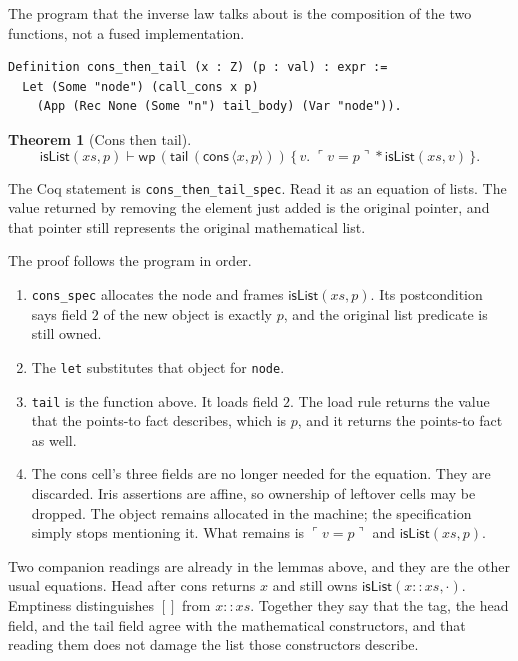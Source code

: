 \documentclass[11pt]{article}
\newtheorem{theorem}{Theorem}
\newcommand{\sep}{\mathbin{*}}
\newcommand{\Wpre}{\mathsf{wp}}
\newcommand{\pure}[1]{\ulcorner #1 \urcorner}
\begin{document}
The program that the inverse law talks about is the composition of the two functions, not a fused implementation.

\begin{lstlisting}
Definition cons_then_tail (x : Z) (p : val) : expr :=
  Let (Some "node") (call_cons x p)
    (App (Rec None (Some "n") tail_body) (Var "node")).
\end{lstlisting}

\begin{theorem}[Cons then tail]
\[
\mathsf{isList}(xs, p)
\vdash
\Wpre\,(\mathsf{tail}\,(\mathsf{cons}\,\langle x, p\rangle))
\,\{\,v.\; \pure{v = p} \sep \mathsf{isList}(xs, v)\,\}.
\]
\end{theorem}

The Coq statement is \texttt{cons\_then\_tail\_spec}.
Read it as an equation of lists.
The value returned by removing the element just added is the original pointer, and that pointer still represents the original mathematical list.

The proof follows the program in order.
\begin{enumerate}
\item \texttt{cons\_spec} allocates the node and frames \(\mathsf{isList}(xs, p)\).
Its postcondition says field \(2\) of the new object is exactly \(p\), and the original list predicate is still owned.
\item The \texttt{let} substitutes that object for \texttt{node}.
\item \texttt{tail} is the function above.
It loads field \(2\).
The load rule returns the value that the points-to fact describes, which is \(p\), and it returns the points-to fact as well.
\item The cons cell's three fields are no longer needed for the equation.
They are discarded.
Iris assertions are affine, so ownership of leftover cells may be dropped.
The object remains allocated in the machine; the specification simply stops mentioning it.
What remains is \(\pure{v = p}\) and \(\mathsf{isList}(xs, p)\).
\end{enumerate}

Two companion readings are already in the lemmas above, and they are the other usual equations.
Head after cons returns \(x\) and still owns \(\mathsf{isList}(x :: xs, \cdot)\).
Emptiness distinguishes \([]\) from \(x :: xs\).
Together they say that the tag, the head field, and the tail field agree with the mathematical constructors, and that reading them does not damage the list those constructors describe.
\end{document}
